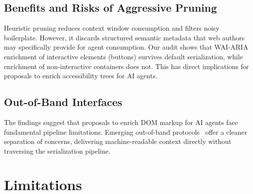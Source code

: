 \documentclass[conference]{IEEEtran}
\begin{document}
\subsection{Benefits and Risks of Aggressive Pruning}

Heuristic pruning reduces context window consumption and filters noisy boilerplate. However, it discards structured semantic metadata that web authors may specifically provide for agent consumption. Our audit shows that WAI-ARIA enrichment of interactive elements (buttons) survives default serialization, while enrichment of non-interactive containers does not. This has direct implications for proposals to enrich accessibility trees for AI agents.

\subsection{Out-of-Band Interfaces}

The findings suggest that proposals to enrich DOM markup for AI agents face fundamental pipeline limitations. Emerging out-of-band protocols~\cite{llmstxt2024, mcp2024} offer a cleaner separation of concerns, delivering machine-readable context directly without traversing the serialization pipeline.

\section{Limitations}
\label{sec:limitations}
\end{document}
